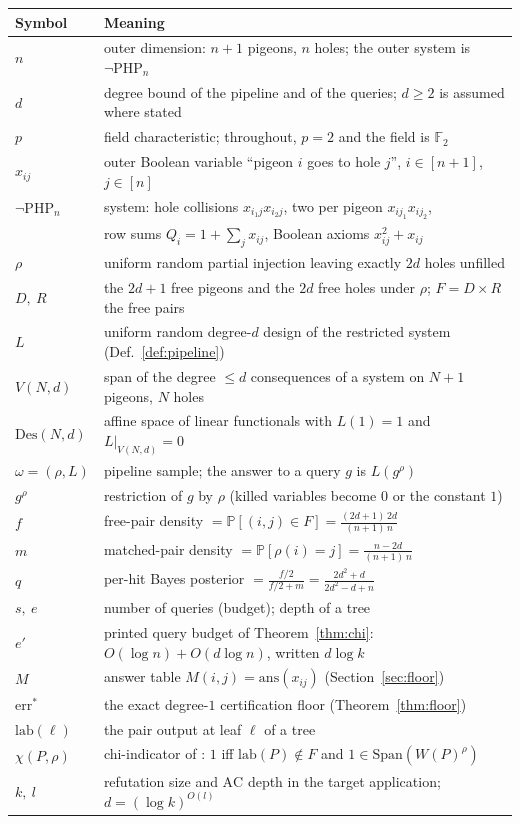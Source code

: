 \documentclass[11pt]{article}
\theoremstyle{definition}
\theoremstyle{remark}
\newcommand{\F}{\mathbb{F}}
\newcommand{\PHPn}{\neg\mathrm{PHP}_n}
\newcommand{\Des}{\mathrm{Des}}
\newcommand{\Sp}{\mathrm{Span}}
\newcommand{\Prob}{\mathbb{P}}
\newcommand{\AC}{\mathrm{AC}}
\newcommand{\lab}{\mathrm{lab}}
\begin{document}
\begin{center}
\small
\begin{tabular}{ll}
\hline
Symbol & Meaning \\
\hline
$n$ & outer dimension: $n+1$ pigeons, $n$ holes; the outer system is
$\PHPn$ \\
$d$ & degree bound of the pipeline and of the queries; $d\ge 2$ is assumed
where stated \\
$p$ & field characteristic; throughout, $p=2$ and the field is $\F_2$ \\
$x_{ij}$ & outer Boolean variable ``pigeon $i$ goes to hole $j$'',
$i\in[n+1]$, $j\in[n]$ \\
$\PHPn$ & system: hole collisions $x_{i_1j}x_{i_2j}$, two per pigeon
$x_{ij_1}x_{ij_2}$, \\
 & row sums $Q_i=1+\sum_j x_{ij}$, Boolean axioms $x_{ij}^2+x_{ij}$ \\
$\rho$ & uniform random partial injection leaving exactly $2d$ holes
unfilled \\
$D,\ R$ & the $2d+1$ free pigeons and the $2d$ free holes under $\rho$;
$F=D\times R$ the free pairs \\
$L$ & uniform random degree-$d$ design of the restricted system
(Def.~\ref{def:pipeline}) \\
$V(N,d)$ & span of the degree $\le d$ consequences of a system on $N+1$
pigeons, $N$ holes \\
$\Des(N,d)$ & affine space of linear functionals with $L(1)=1$ and
$L|_{V(N,d)}=0$ \\
$\omega=(\rho,L)$ & pipeline sample; the answer to a query $g$ is
$L(g^\rho)$ \\
$g^\rho$ & restriction of $g$ by $\rho$ (killed variables become $0$ or
the constant $1$) \\
$f$ & free-pair density $=\Prob[(i,j)\in F]=\frac{(2d+1)\,2d}{(n+1)\,n}$ \\
$m$ & matched-pair density $=\Prob[\rho(i)=j]=\frac{n-2d}{(n+1)\,n}$ \\
$q$ & per-hit Bayes posterior $=\frac{f/2}{f/2+m}=\frac{2d^2+d}{2d^2-d+n}$ \\
$s,\ e$ & number of queries (budget); depth of a tree \\
$e'$ & printed query budget of Theorem~\ref{thm:chi}:
$O(\log n)+O(d\log n)$, written $d\log k$ \\
$M$ & answer table $M(i,j)=\mathrm{ans}(x_{ij})$
(Section~\ref{sec:floor}) \\
$\mathrm{err}^*$ & the exact degree-$1$ certification floor
(Theorem~\ref{thm:floor}) \\
$\lab(\ell)$ & the pair output at leaf $\ell$ of a tree \\
$\chi(P,\rho)$ & chi-indicator of \cite{Kra26}: $1$ iff $\lab(P)\notin F$
and $1\in\Sp(W(P)^\rho)$ \\
$k,\ l$ & refutation size and $\AC$ depth in the target application;
$d=(\log k)^{O(l)}$ \\
\hline
\end{tabular}
\end{center}
\end{document}
